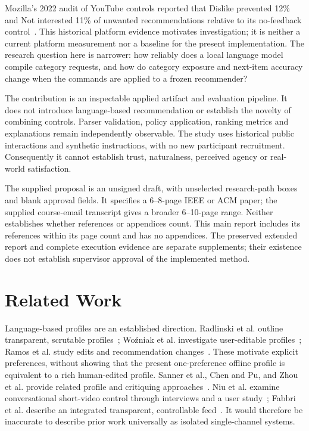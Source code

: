 \documentclass[conference]{IEEEtran}
\begin{document}
Mozilla's 2022 audit of YouTube controls reported that Dislike prevented 12\% and Not interested 11\% of unwanted recommendations relative to its no-feedback control~\cite{ricks2022button}. This historical platform evidence motivates investigation; it is neither a current platform measurement nor a baseline for the present implementation. The research question here is narrower: how reliably does a local language model compile category requests, and how do category exposure and next-item accuracy change when the commands are applied to a frozen recommender?

The contribution is an inspectable applied artifact and evaluation pipeline. It does not introduce language-based recommendation or establish the novelty of combining controls. Parser validation, policy application, ranking metrics and explanations remain independently observable. The study uses historical public interactions and synthetic instructions, with no new participant recruitment. Consequently it cannot establish trust, naturalness, perceived agency or real-world satisfaction.

The supplied proposal is an unsigned draft, with unselected research-path boxes and blank approval fields. It specifies a 6--8-page IEEE or ACM paper; the supplied course-email transcript gives a broader 6--10-page range. Neither establishes whether references or appendices count. This main report includes its references within its page count and has no appendices. The preserved extended report and complete execution evidence are separate supplements; their existence does not establish supervisor approval of the implemented method.

\section{Related Work}
Language-based profiles are an established direction. Radlinski et al. outline transparent, scrutable profiles~\cite{radlinski2022profiles}; Wo\'{z}niak et al. investigate user-editable profiles~\cite{wozniak2025profiles}; Ramos et al. study edits and recommendation changes~\cite{ramos2024transparent}. These motivate explicit preferences, without showing that the present one-preference offline profile is equivalent to a rich human-edited profile. Sanner et al., Chen and Pu, and Zhou et al. provide related profile and critiquing approaches~\cite{sanner2023competitive,chen2012critiquing,zhou2024language}. Niu et al. examine conversational short-video control through interviews and a user study~\cite{niu2025chat}; Fabbri et al. describe an integrated transparent, controllable feed~\cite{fabbri2026feeding}. It would therefore be inaccurate to describe prior work universally as isolated single-channel systems.
\end{document}
